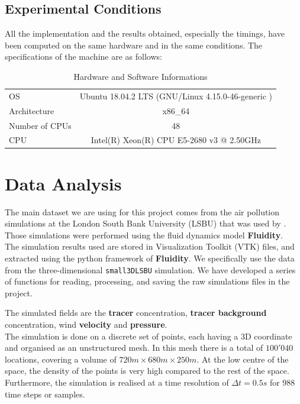 \subsection{Experimental Conditions}

All the implementation and the results obtained, especially the timings, have been computed on the same hardware and in the same conditions. The specifications of the machine are as follows:

\begin{table}[h!]
\centering
\begin{tabular}{l|c}
\toprule

OS & Ubuntu 18.04.2 LTS (GNU/Linux 4.15.0-46-generic ) \\ 
Architecture    &    x86\_64 \\ 

Number of CPUs          &    48\\ 

CPU     &    Intel(R) Xeon(R) CPU E5-2680 v3 @ 2.50GHz \\ \bottomrule

\end{tabular}
\caption{Hardware and Software Informations}
\end{table}



\section{Data Analysis}
The main dataset we are using for this project comes from the air pollution simulations at the London South Bank University (LSBU) that was used by \citet{arcucci_optimal_2019}. Those simulations were performed using the fluid dynamics model \textbf{Fluidity}. \\ 


The simulation results used are stored in Visualization Toolkit (VTK) files, and extracted using the python framework of \textbf{Fluidity}. We specifically use the data from the three-dimensional \texttt{small3DLSBU} simulation. We have developed a series of functions for reading, processing, and saving the raw simulations files in the project. 

The simulated fields are the \textbf{tracer} concentration, \textbf{tracer background} concentration, wind \textbf{velocity} and \textbf{pressure}. \\


The simulation is done on a discrete set of points, each having a 3D coordinate and organised as an unstructured mesh. In this mesh there is a total of $100'040$ locations, covering a volume of $720m \times 680m \times 250m$.  At the low centre of the space, the density of the points is very high compared to the rest of the space. Furthermore, the simulation is realised at a time resolution of $\Delta t = 0.5s$ for $988$ time steps or samples. \\
 

